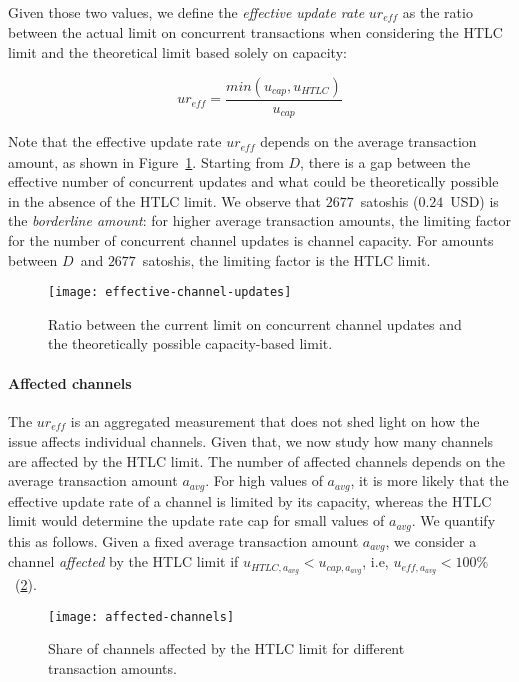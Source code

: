 Given those two values, we define the \textit{effective update rate} $ur_\textit{eff}$ as the ratio between the actual limit on concurrent transactions when considering the HTLC limit and the theoretical limit based solely on capacity:

\[ur_\textit{eff} = \frac{min(u_\textit{cap}, u_\textit{HTLC})}{u_\textit{cap}}\]

Note that the effective update rate $ur_\textit{eff}$ depends on the average transaction amount, as shown in Figure~\ref{fig:effective-channel-updates}.
Starting from $D$, there is a gap between the effective number of concurrent updates and what could be theoretically possible in the absence of the HTLC limit.
We observe that $2677$~satoshis ($0.24$~USD) is the \textit{borderline amount}: for higher average transaction amounts, the limiting factor for the number of concurrent channel updates is channel capacity.
For amounts between $D$~and $2677$~satoshis, the limiting factor is the HTLC limit.

\begin{figure}[tb]
	\centering
	\texttt{[image: effective-channel-updates]}
	\caption{Ratio between the current limit on concurrent channel updates and the theoretically possible 
		capacity-based limit.\label{fig:effective-channel-updates}}
\end{figure}

\paragraph{Affected channels}
The $ur_\textit{eff}$ is an aggregated measurement that does not shed light on how the issue affects individual channels. 
Given that, we now study how many channels are affected by the HTLC limit.
The number of affected channels depends on the average transaction amount $a_\textit{avg}$.
For high values of $a_\textit{avg}$, it is more likely that the effective update rate of a channel is limited by its capacity, whereas the HTLC limit would determine the update rate cap for small values of $a_\textit{avg}$.
We quantify this as follows.
Given a fixed average transaction amount $a_\textit{avg}$, we consider a channel \textit{affected} by the HTLC limit if $u_{\textit{HTLC},a_\textit{avg}} < u_{\textit{cap},a_\textit{avg}}$, i.e, $u_{\textit{eff},a_\textit{avg}} < 100\%$~(\cref{fig:affected-channels}).

\begin{figure}[tb]
	\centering
	\texttt{[image: affected-channels]}
	\caption{Share of channels affected by the HTLC limit for different transaction amounts. \label{fig:affected-channels}}
\end{figure}


